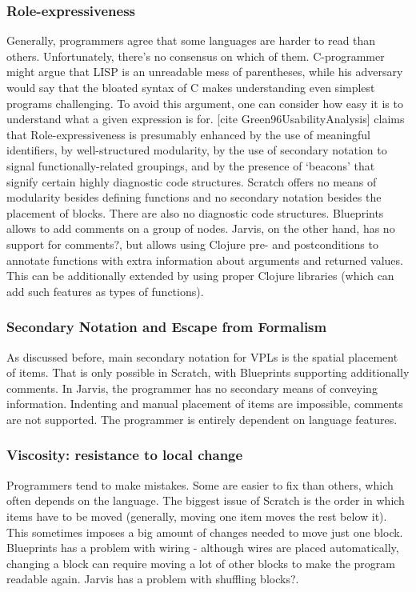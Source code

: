 \documentclass[11pt]{scrartcl}
\begin{document}
\subsubsection{Role-expressiveness}
Generally, programmers agree that some languages are harder to read than others. Unfortunately, there’s no consensus on which of them. C-programmer might argue that LISP is an unreadable mess of parentheses, while his adversary would say that the bloated syntax of C makes understanding even simplest programs challenging. To avoid this argument, one can consider how easy it is to understand what a given expression is for. [cite Green96UsabilityAnalysis] claims that
Role-expressiveness is presumably enhanced by the use of meaningful identifiers, by well-structured modularity, by the use of secondary notation to signal functionally-related groupings, and by the presence of ‘beacons’ that signify certain highly diagnostic code structures.
Scratch offers no means of modularity besides defining functions and no secondary notation besides the placement of blocks. There are also no diagnostic code structures. Blueprints allows to add comments on a group of nodes. Jarvis, on the other hand, has no support for comments{?}, but allows using Clojure pre- and postconditions to annotate functions with extra information about arguments and returned values. This can be additionally extended by using proper Clojure libraries (which can add such features as types of functions).
\subsubsection{Secondary Notation and Escape from Formalism}
As discussed before, main secondary notation for VPLs is the spatial placement of items. That is only possible in Scratch, with Blueprints supporting additionally comments. In Jarvis, the programmer has no secondary means of conveying information. Indenting and manual placement of items are impossible, comments are not supported. The programmer is entirely dependent on language features.
\subsubsection{Viscosity: resistance to local change}
Programmers tend to make mistakes. Some are easier to fix than others, which often depends on the language. The biggest issue of Scratch is the order in which items have to be moved (generally, moving one item moves the rest below it). This sometimes imposes a big amount of changes needed to move just one block. Blueprints has a problem with wiring - although wires are placed automatically, changing a block can require moving a lot of other blocks to make the program readable again. Jarvis has a problem with shuffling blocks{?}.
\end{document}

